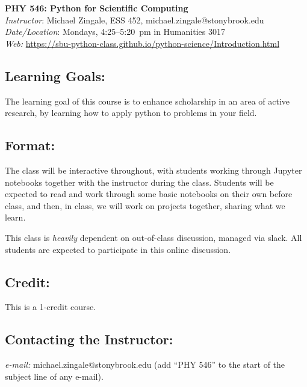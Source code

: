 \documentclass[11pt]{article}
\begin{document}
\begin{center}
{\LARGE \sffamily \bfseries PHY 546: Python for Scientific Computing} \\[3mm]
{\em Instructor}\/: Michael Zingale, ESS 452, michael.zingale@stonybrook.edu \\
{\em Date/Location}\/: Mondays, 4:25--5:20~pm in Humanities 3017 \\
{\em Web:}\/ {\small \url{https://sbu-python-class.github.io/python-science/Introduction.html}}
\end{center}

\subsection*{Learning Goals:}

The learning goal of this course is to enhance scholarship in an area
of active research, by learning how to apply python to problems
in your field.


\subsection*{Format:}

The class will be interactive throughout, with students working
through Jupyter notebooks together with the instructor during the
class.  Students will be expected to read and work through some basic
notebooks on their own before class, and then, in class, we will work
on projects together, sharing what we learn.

This class is {\em heavily} dependent on out-of-class discussion,
managed via slack.  All students are expected to participate in this
online discussion.

\subsection*{Credit:}

This is a 1-credit course.


\subsection*{Contacting the Instructor:}

{\em e-mail:} michael.zingale@stonybrook.edu ({add ``PHY 546'' to the
 start of the subject line of any e-mail}).
%
\end{document}
